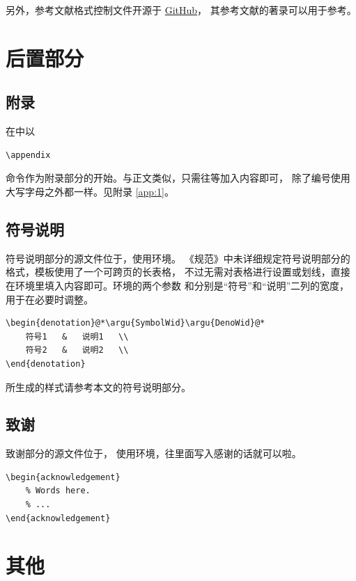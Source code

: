 另外，参考文献格式控制文件开源于
\href{https://github.com/Haixing-Hu/GBT7714-2005-BibTeX-Style}{GitHub}，
其参考文献的著录可以用于参考。

\section{后置部分}\label{sec:backmatter}
\subsection{附录}\label{sec:app}
在中以
\begin{lstlisting}
\appendix
		\end{lstlisting}
命令作为附录部分的开始。与正文类似，只需往等加入内容即可，
除了编号使用大写字母之外都一样。见附录 \ref{app:1}。

\subsection{符号说明}\label{sec:deno}
符号说明部分的源文件位于，使用环境。
《规范》中未详细规定符号说明部分的格式，模板使用了一个可跨页的长表格，
不过无需对表格进行设置或划线，直接在环境里填入内容即可。环境的两个参数
和分别是“符号”和“说明”二列的宽度，用于在必要时调整。

\begin{lstlisting}
\begin{denotation}@*\argu{SymbolWid}\argu{DenoWid}@*
	符号1   &   说明1   \\
	符号2   &   说明2   \\
\end{denotation}
		\end{lstlisting}
所生成的样式请参考本文的符号说明部分。

\subsection{致谢}
致谢部分的源文件位于，
使用环境，往里面写入感谢的话就可以啦。
\begin{lstlisting}
\begin{acknowledgement}
	% Words here.
	% ...
\end{acknowledgement}
		\end{lstlisting}

\section{其他}\label{sec:other}

